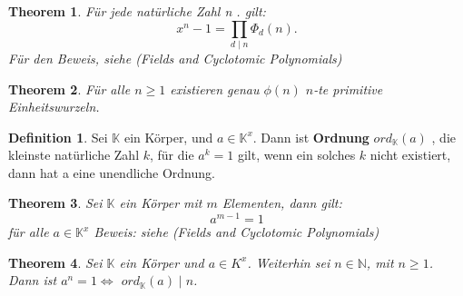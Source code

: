 \documentclass[12pt,oneside]{article}
\newtheorem{theorem}{Theorem}[section]
\theoremstyle{remark}
\theoremstyle{definition}
\newtheorem{definition}{Definition}[section]
\begin{document}
\smallskip

\begin{theorem}\label{impor_cyc_lemma}
Für jede natürliche Zahl n . gilt:\newline
\begin{equation}
    x^n - 1 = \prod_{d \mid n} \Phi_{d}(n).
\end{equation}
Für den Beweis, siehe (Fields and Cyclotomic Polynomials) 
\end{theorem}

\smallskip

\begin{theorem}\label{num_of_prim_uni}
Für alle $n \geq 1$ existieren genau $\phi(n)$ $n$-te primitive Einheitswurzeln. 
\end{theorem}

\smallskip

\begin{definition}\label{ord_def}
Sei $\mathbb{K}$ ein Körper, und $a \in \mathbb{K}^x$. Dann ist \textbf{Ordnung} $ ord_{ \mathbb{K} }(a)$ , die kleinste natürliche Zahl $k$, für die $a^k = 1 $ gilt, wenn ein solches $k$ nicht existiert, dann hat a eine unendliche Ordnung. 
\end{definition}

\smallskip

\begin{theorem}
Sei $\mathbb{K}$ ein Körper mit $m$ Elementen, dann gilt:
\begin{equation}
    a^{m-1} = 1
\end{equation}
für alle $a \in \mathbb{K}^x$\newline
Beweis: siehe (Fields and Cyclotomic Polynomials) 
\end{theorem}

\smallskip

\begin{theorem}
Sei $\mathbb{K}$ ein Körper und $a \in K^x$. Weiterhin sei $ n \in \mathbb{N}$, mit $n \geq 1$. Dann ist $a^n = 1 \Leftrightarrow	 $ $ord_{\mathbb{K}}(a) \mid n$. 
\end{theorem}

\smallskip
\end{document}
